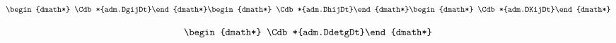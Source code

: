 \documentclass[12pt]{cdblatex}
\begin{document}
\clearpage

\begin{dgroup*}
   \begin{dmath*} \Cdb*{adm.DgijDt}\end{dmath*}
   \begin{dmath*} \Cdb*{adm.DhijDt}\end{dmath*}
   \begin{dmath*} \Cdb*{adm.DKijDt}\end{dmath*}
\end{dgroup*}

\begin{dgroup*}
   \begin{dmath*} \Cdb*{adm.DdetgDt}\end{dmath*}
\end{dgroup*}
\end{document}
